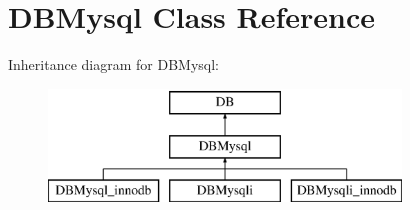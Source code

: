 \hypertarget{classDBMysql}{}\section{D\+B\+Mysql Class Reference}
\label{classDBMysql}
Inheritance diagram for D\+B\+Mysql\+:\begin{figure}[H]
\begin{center}
\leavevmode
\includegraphics[height=3.000000cm]{classDBMysql}
\end{center}
\end{figure}
